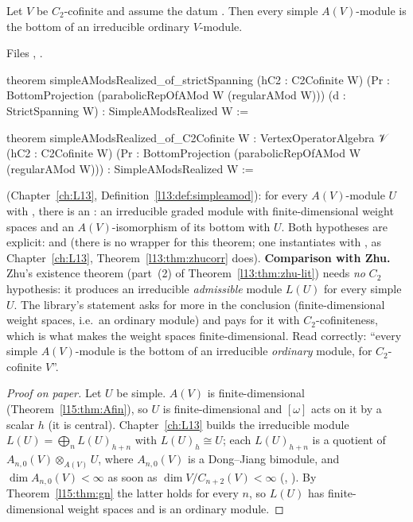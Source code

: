 \begin{theorem}\label{l15:thm:realized}
Let $V$ be $C_2$-cofinite and assume the datum . Then every simple $A(V)$-module is the bottom of an
irreducible ordinary $V$-module.
\end{theorem}
\noindent Files ,
.
\begin{leancode}
theorem simpleAModsRealized_of_strictSpanning (hC2 : C2Cofinite W)
    (Pr : BottomProjection (parabolicRepOfAMod W (regularAMod W)))
    (d : StrictSpanning W) : SimpleAModsRealized W :=

theorem simpleAModsRealized_of_C2Cofinite {W : VertexOperatorAlgebra 𝒱}
    (hC2 : C2Cofinite W)
    (Pr : BottomProjection (parabolicRepOfAMod W (regularAMod W))) :
    SimpleAModsRealized W :=
\end{leancode}

\begin{dictionary}
 (Chapter~\ref{ch:L13}, Definition~\ref{l13:def:simpleamod}): for every $A(V)$-module $U$ with
, there is an : an irreducible graded module with finite-dimensional weight
spaces and an $A(V)$-isomorphism of its bottom with $U$. Both hypotheses are explicit:  and 
(there is no  wrapper for this theorem; one instantiates  with , as
Chapter~\ref{ch:L13}, Theorem~\ref{l13:thm:zhucorr} does). \textbf{Comparison with Zhu.} Zhu's existence theorem (part~(2) of
Theorem~\ref{l13:thm:zhu-lit}) needs \emph{no} $C_2$ hypothesis: it produces an irreducible \emph{admissible} module $L(U)$
for every simple $U$. The library's statement asks for more in the conclusion (finite-dimensional weight spaces, i.e.\ an
ordinary module) and pays for it with $C_2$-cofiniteness, which is what makes the weight spaces finite-dimensional. Read
correctly: ``every simple $A(V)$-module is the bottom of an irreducible \emph{ordinary} module, for $C_2$-cofinite $V$''.
\end{dictionary}

\begin{proof}[Proof on paper]
Let $U$ be simple. $A(V)$ is finite-dimensional (Theorem~\ref{l15:thm:Afin}), so $U$ is finite-dimensional and $[\omega]$
acts on it by a scalar $h$ (it is central). Chapter~\ref{ch:L13} builds the irreducible module $L(U)=\bigoplus_nL(U)_{h+n}$
with $L(U)_h\cong U$; each $L(U)_{h+n}$ is a quotient of $A_{n,0}(V)\otimes_{A(V)}U$, where $A_{n,0}(V)$ is a Dong--Jiang
bimodule, and $\dim A_{n,0}(V)<\infty$ as soon as $\dim V/C_{n+2}(V)<\infty$
(\allowbreak{}\allowbreak{}, ). By Theorem~\ref{l15:thm:gn} the
latter holds for every $n$, so $L(U)$ has finite-dimensional weight spaces and is an ordinary module.
\end{proof}

